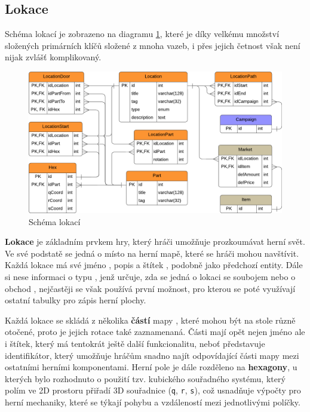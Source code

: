 \subsection{Lokace}
\label{subsec:schema_location}

Schéma lokací je zobrazeno na diagramu \ref{diag:er_location}, které je díky velkému množství složených primárních klíčů složené z mnoha vazeb, i přes jejich četnost však není nijak zvlášť komplikovaný.

\begin{figure}[h]
    \centering
    \includegraphics{../../shared/diagrams/er_location.pdf}
    \caption{Schéma lokací}
    \label{diag:er_location}
\end{figure}

\textbf{Lokace} je základním prvkem hry, který hráči umožňuje prozkoumávat herní svět. Ve své podstatě se jedná o místo na herní mapě, které se hráči mohou navštívit. Každá lokace má své jméno , popis  a štítek , podobně jako předchozí entity. Dále si nese informaci o typu , jenž určuje, zda se jedná o lokaci se soubojem  nebo o obchod , nejčastěji se však používá první možnost, pro kterou se poté využívají ostatní tabulky pro zápis herní plochy.

Každá lokace se skládá z několika \textbf{částí} mapy , které mohou být na stole různě otočené, proto je jejich rotace  také zaznamenaná. Části mají opět nejen jméno ale i štítek, který má tentokrát ještě další funkcionalitu, neboť představuje identifikátor, který umožňuje hráčům snadno najít odpovídající části mapy mezi ostatními herními komponentami. Herní pole je dále rozděleno na \textbf{hexagony}, u kterých bylo rozhodnuto o použití tzv. kubického souřadného systému, který polím ve 2D prostoru přiřadí 3D souřadnice (\texttt{q}, \texttt{r}, \texttt{s}), což usnadňuje výpočty pro herní mechaniky, které se týkají pohybu a vzdáleností mezi jednotlivými políčky.

